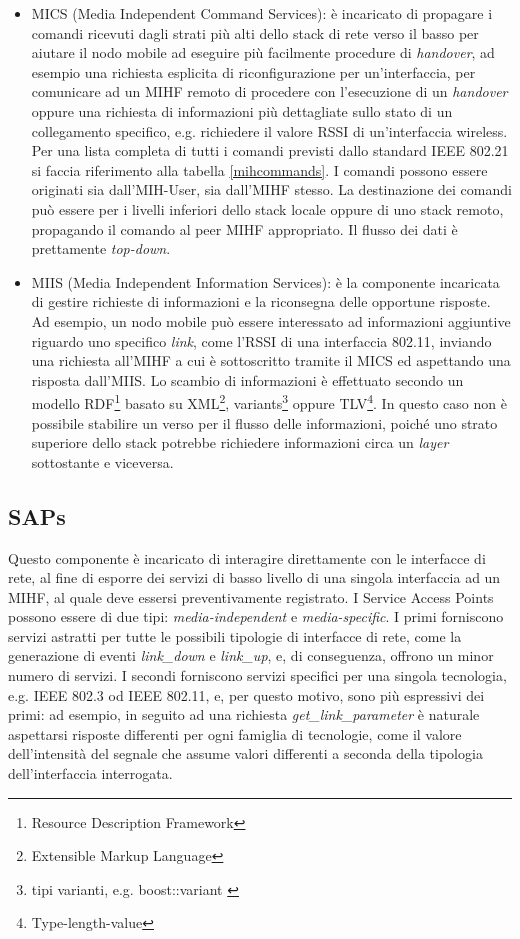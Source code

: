 \begin{itemize}
\item MICS (Media Independent Command Services): è incaricato di propagare i comandi ricevuti dagli strati più alti dello stack di rete verso il basso per aiutare il nodo mobile ad eseguire più facilmente procedure di {\em handover}, ad esempio una richiesta esplicita di riconfigurazione per un'interfaccia, per comunicare ad un MIHF remoto di procedere con l'esecuzione di un {\em handover} oppure una richiesta di informazioni più dettagliate sullo stato di un collegamento specifico, e.g. richiedere il valore RSSI di un'interfaccia wireless. Per una lista completa di tutti i comandi previsti dallo standard IEEE 802.21 si faccia riferimento alla tabella \ref{mihcommands}. I comandi possono essere originati sia dall'MIH-User, sia dall'MIHF stesso. La destinazione dei comandi può essere per i livelli inferiori dello stack locale oppure di uno stack remoto, propagando il comando al peer MIHF appropriato. Il flusso dei dati è prettamente {\em top-down}.

\item MIIS (Media Independent Information Services): è la componente incaricata di gestire richieste di informazioni e la riconsegna delle opportune risposte. Ad esempio, un nodo mobile può essere interessato ad informazioni aggiuntive riguardo uno specifico {\em link}, come l'RSSI di una interfaccia 802.11, inviando una richiesta all'MIHF a cui è sottoscritto tramite il MICS ed aspettando una risposta dall'MIIS. Lo scambio di informazioni è effettuato secondo un modello RDF\footnote{Resource Description Framework} basato su XML\footnote{Extensible Markup Language}, variants\footnote{tipi varianti, e.g. boost::variant \cite{variants}} oppure TLV\footnote{Type-length-value}. In questo caso non è possibile stabilire un verso per il flusso delle informazioni, poiché uno strato superiore dello stack potrebbe richiedere informazioni circa un {\em layer} sottostante e viceversa.
\end{itemize}

\subsection{SAPs}
Questo componente è incaricato di interagire direttamente con le interfacce di rete, al fine di esporre dei servizi di basso livello di una singola interfaccia ad un MIHF, al quale deve essersi preventivamente registrato.
I Service Access Points possono essere di due tipi: {\em media-independent} e {\em media-specific}.
I primi forniscono servizi astratti per tutte le possibili tipologie di interfacce di rete, come la generazione di eventi {\em link\_down} e {\em link\_up}, e, di conseguenza, offrono un minor numero di servizi.
I secondi forniscono servizi specifici per una singola tecnologia, e.g. IEEE 802.3 od IEEE 802.11, e, per questo motivo, sono più espressivi dei primi: ad esempio, in seguito ad una richiesta {\em get\_link\_parameter} è naturale aspettarsi risposte differenti per ogni famiglia di tecnologie, come il valore dell'intensità del segnale che assume valori differenti a seconda della tipologia dell'interfaccia interrogata. 

